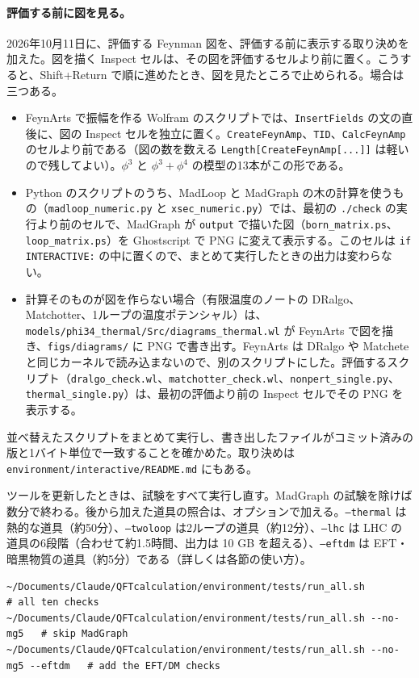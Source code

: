 \documentclass[a4paper,10pt]{ltjsarticle}
\begin{document}
\paragraph{評価する前に図を見る。}2026年10月11日に、評価する Feynman 図を、評価する前に表示する取り決めを加えた。図を描く Inspect セルは、その図を評価するセルより前に置く。こうすると、Shift+Return で順に進めたとき、図を見たところで止められる。場合は三つある。
\begin{itemize}
\item FeynArts で振幅を作る Wolfram のスクリプトでは、\texttt{InsertFields} の文の直後に、図の Inspect セルを独立に置く。\texttt{CreateFeynAmp}、\texttt{TID}、\texttt{CalcFeynAmp} のセルより前である（図の数を数える \texttt{Length[CreateFeynAmp[...]]} は軽いので残してよい）。$\phi^3$ と $\phi^3+\phi^4$ の模型の13本がこの形である。
\item Python のスクリプトのうち、MadLoop と MadGraph の木の計算を使うもの（\texttt{madloop\_numeric.py} と \texttt{xsec\_numeric.py}）では、最初の \texttt{./check} の実行より前のセルで、MadGraph が \texttt{output} で描いた図（\texttt{born\_matrix.ps}、\texttt{loop\_matrix.ps}）を Ghostscript で PNG に変えて表示する。このセルは \texttt{if INTERACTIVE:} の中に置くので、まとめて実行したときの出力は変わらない。
\item 計算そのものが図を作らない場合（有限温度のノートの DRalgo、Matchotter、1ループの温度ポテンシャル）は、\nolinkurl{models/phi34_thermal/Src/diagrams_thermal.wl} が FeynArts で図を描き、\nolinkurl{figs/diagrams/} に PNG で書き出す。FeynArts は DRalgo や Matchete と同じカーネルで読み込まないので、別のスクリプトにした。評価するスクリプト（\texttt{dralgo\_check.wl}、\texttt{matchotter\_check.wl}、\texttt{nonpert\_single.py}、\texttt{thermal\_single.py}）は、最初の評価より前の Inspect セルでその PNG を表示する。
\end{itemize}
並べ替えたスクリプトをまとめて実行し、書き出したファイルがコミット済みの版と1バイト単位で一致することを確かめた。取り決めは \nolinkurl{environment/interactive/README.md} にもある。

ツールを更新したときは、試験をすべて実行し直す。MadGraph の試験を除けば数分で終わる。後から加えた道具の照合は、オプションで加える。\texttt{--thermal} は熱的な道具（約50分）、\texttt{--twoloop} は2ループの道具（約12分）、\texttt{--lhc} は LHC の道具の6段階（合わせて約1.5時間、出力は 10 GB を超える）、\texttt{--eftdm} は EFT・暗黒物質の道具（約5分）である（詳しくは各節の使い方）。

\begin{Verbatim}
~/Documents/Claude/QFTcalculation/environment/tests/run_all.sh            # all ten checks
~/Documents/Claude/QFTcalculation/environment/tests/run_all.sh --no-mg5   # skip MadGraph
~/Documents/Claude/QFTcalculation/environment/tests/run_all.sh --no-mg5 --eftdm   # add the EFT/DM checks
\end{Verbatim}
\end{document}
